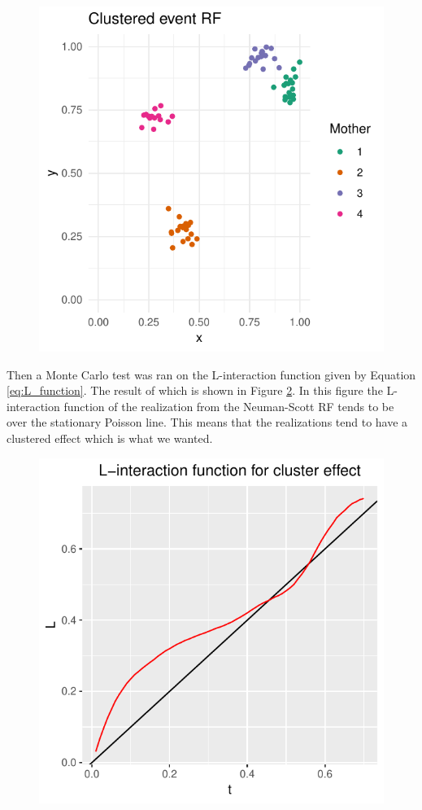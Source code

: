 \begin{figure}
    \centering
    \includegraphics[scale=0.95]{figures/cluster_event_rf.pdf}
    \caption{}
    \label{fig:cluster_event_rf}
\end{figure}
Then a Monte Carlo test was ran on the L-interaction function given by Equation \ref{eq:L_function}. The result of which is shown in Figure \ref{fig:cluster_L_function}. In this figure the L-interaction function of the realization from the Neuman-Scott RF tends to be over the stationary Poisson line. This means that the realizations tend to have a clustered effect which is what we wanted. 
\begin{figure}
    \centering
    \includegraphics[scale=0.95]{figures/L_cluster_plot.pdf}
    \caption{}
    \label{fig:cluster_L_function}
\end{figure}
